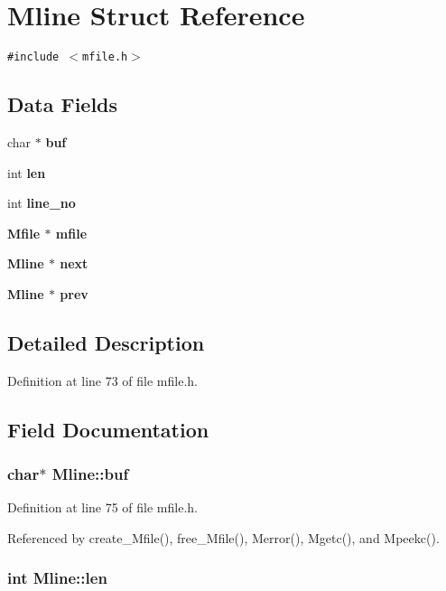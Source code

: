 \section{Mline Struct Reference}
\label{structMline}
{\tt \#include $<$mfile.h$>$}

\subsection*{Data Fields}
\begin{CompactItemize}
\item 
char $\ast$ \bf{buf}
\item 
int \bf{len}
\item 
int \bf{line\_\-no}
\item 
\bf{Mfile} $\ast$ \bf{mfile}
\item 
\bf{Mline} $\ast$ \bf{next}
\item 
\bf{Mline} $\ast$ \bf{prev}
\end{CompactItemize}


\subsection{Detailed Description}




Definition at line 73 of file mfile.h.

\subsection{Field Documentation}
\subsubsection{\setlength{\rightskip}{0pt plus 5cm}char$\ast$ \bf{Mline::buf}}\label{structMline_13f9957934524af41830e1bcd34e0bd9}




Definition at line 75 of file mfile.h.

Referenced by create\_\-Mfile(), free\_\-Mfile(), Merror(), Mgetc(), and Mpeekc().
\subsubsection{\setlength{\rightskip}{0pt plus 5cm}int \bf{Mline::len}}\label{structMline_d96ea01e4002cb477d1240d414f5984e}




